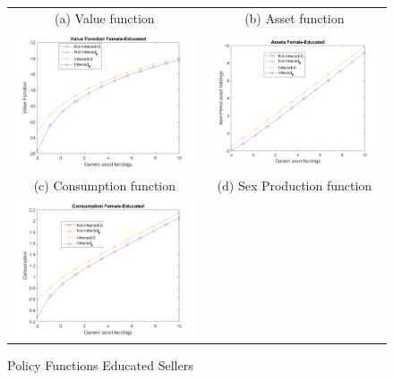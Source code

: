 \begin{figure}[H]
\begin{center}
\begin{tabular}{cc}
\end{tabular}
\end{center}
\label{fig:2}
\end{figure}

\begin{figure}[H]
\caption{Policy Functions Educated Sellers}
\hspace{-2.0cm}
\begin{center}
\begin{tabular}{cc}
\multicolumn{1}{c}{(a) Value function} &  
\multicolumn{1}{c}{(b) Asset function} \\
\includegraphics[angle=0,width=.5\textwidth]{figures/FIG5.png}   & 
\includegraphics[angle=0,width=.5\textwidth]{figures/FIG7.png} \\
\multicolumn{1}{c}{(c) Consumption function} &  
\multicolumn{1}{c}{(d) Sex Production function } \\
\includegraphics[angle=0,width=.5\textwidth]{figures/FIG6.png}   & 

\end{tabular}
\end{center}
\end{figure}
